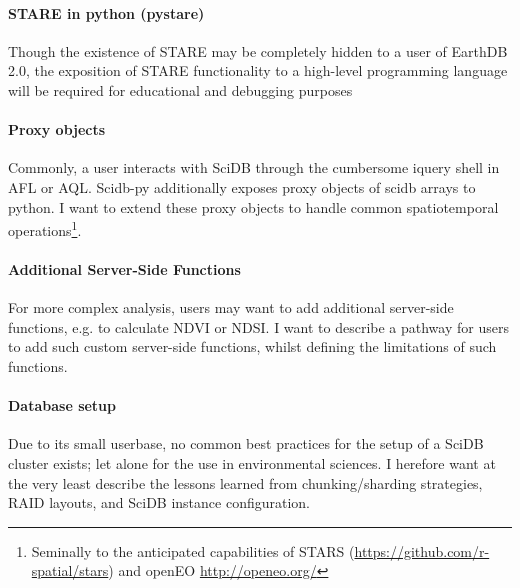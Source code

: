 \documentclass[letterpaper, parskip=half]{scrartcl}
\begin{document}
\paragraph{STARE in python (pystare)}
Though the existence of STARE may be completely hidden to a user of EarthDB 2.0, the exposition of STARE functionality to a high-level programming language will be required for educational and debugging purposes

\paragraph{Proxy objects}
Commonly, a user interacts with SciDB through the cumbersome iquery shell in \gls{AFL} or \gls{AQL}. Scidb-py additionally exposes proxy objects of scidb arrays to python. I want to extend these proxy objects to handle common spatiotemporal operations\footnote{Seminally to the anticipated capabilities of STARS (\url{https://github.com/r-spatial/stars}) and openEO \url{http://openeo.org/}}.

\paragraph{Additional Server-Side Functions}
For more complex analysis, users may want to add additional server-side functions, e.g. to calculate \gls{NDVI} or \gls{NDSI}. I want to describe a pathway for users to add such custom server-side functions, whilst defining the limitations of such functions.

\paragraph{Database setup}
Due to its small userbase, no common best practices for the setup of a SciDB cluster exists; let alone for the use in environmental sciences. I herefore want at the very least describe the lessons learned from chunking/sharding strategies, RAID layouts, and SciDB instance configuration.



\end{document}
